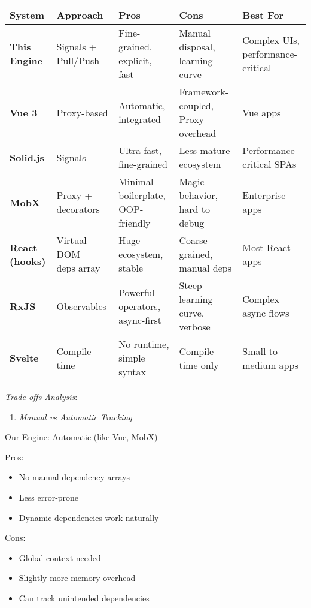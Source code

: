 \documentclass[11pt]{article}
\begin{document}
\begin{center}
\begin{tabular}{lllll}
System & Approach & Pros & Cons & Best For\\
\hline
\textbf{\textbf{This Engine}} & Signals + Pull/Push & Fine-grained, explicit, fast & Manual disposal, learning curve & Complex UIs, performance-critical\\
\textbf{\textbf{Vue 3}} & Proxy-based & Automatic, integrated & Framework-coupled, Proxy overhead & Vue apps\\
\textbf{\textbf{Solid.js}} & Signals & Ultra-fast, fine-grained & Less mature ecosystem & Performance-critical SPAs\\
\textbf{\textbf{MobX}} & Proxy + decorators & Minimal boilerplate, OOP-friendly & Magic behavior, hard to debug & Enterprise apps\\
\textbf{\textbf{React (hooks)}} & Virtual DOM + deps array & Huge ecosystem, stable & Coarse-grained, manual deps & Most React apps\\
\textbf{\textbf{RxJS}} & Observables & Powerful operators, async-first & Steep learning curve, verbose & Complex async flows\\
\textbf{\textbf{Svelte}} & Compile-time & No runtime, simple syntax & Compile-time only & Small to medium apps\\
\end{tabular}
\end{center}

\emph{Trade-offs Analysis}:

\begin{enumerate}
\item \emph{Manual vs Automatic Tracking}
\end{enumerate}

Our Engine: Automatic (like Vue, MobX)

Pros:
\begin{itemize}
\item No manual dependency arrays
\item Less error-prone
\item Dynamic dependencies work naturally
\end{itemize}

Cons:
\begin{itemize}
\item Global context needed
\item Slightly more memory overhead
\item Can track unintended dependencies
\end{itemize}
\end{document}
